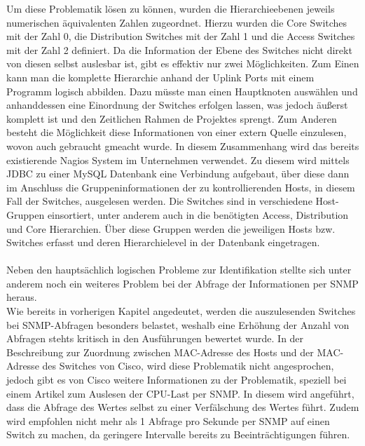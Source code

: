 Um diese Problematik lösen zu können, wurden die Hierarchieebenen jeweils numerischen äquivalenten Zahlen zugeordnet.
Hierzu wurden die Core Switches mit der Zahl 0, die Distribution Switches mit der Zahl 1 und die Access Switches mit der Zahl 2 definiert.
Da die Information der Ebene des Switches nicht direkt von diesen selbst auslesbar ist, gibt es effektiv nur zwei Möglichkeiten.
Zum Einen kann man die komplette Hierarchie anhand der Uplink Ports mit einem Programm logisch abbilden.
Dazu müsste man einen Hauptknoten auswählen und anhanddessen eine Einordnung der Switches erfolgen lassen, was jedoch äußerst komplett ist und den Zeitlichen Rahmen de Projektes sprengt.
Zum Anderen besteht die Möglichkeit diese Informationen von einer extern Quelle einzulesen, wovon auch gebraucht gmeacht wurde.
In diesem Zusammenhang wird das bereits existierende Nagios System im Unternehmen verwendet. Zu diesem wird mittels JDBC zu einer MySQL Datenbank eine Verbindung aufgebaut, über diese dann im Anschluss die Gruppeninformationen der zu kontrollierenden Hosts, in diesem Fall der Switches, ausgelesen werden. Die Switches sind in verschiedene Host-Gruppen einsortiert, unter anderem auch in die benötigten Access, Distribution und Core Hierarchien. Über diese Gruppen werden die jeweiligen Hosts bzw. Switches erfasst und deren Hierarchielevel in der Datenbank eingetragen.\\\\
Neben den hauptsächlich logischen Probleme zur Identifikation stellte sich unter anderem noch ein weiteres Problem bei der Abfrage der Informationen per SNMP heraus.\\
Wie bereits in vorherigen Kapitel angedeutet, werden die auszulesenden Switches bei SNMP-Abfragen besonders belastet, weshalb eine Erhöhung der Anzahl von Abfragen stehts kritisch in den Ausführungen bewertet wurde.
In der Beschreibung zur Zuordnung zwischen MAC-Adresse des Hosts und der MAC-Adresse des Switches von Cisco, wird diese Problematik nicht angesprochen, jedoch gibt es von Cisco weitere Informationen zu der Problematik, speziell bei einem Artikel zum Auslesen der CPU-Last per SNMP. In diesem wird angeführt, dass die Abfrage des Wertes selbst zu einer Verfälschung des Wertes führt. Zudem wird empfohlen nicht mehr als 1 Abfrage pro Sekunde per SNMP auf einen Switch zu machen, da geringere Intervalle bereits zu Beeinträchtigungen führen.
